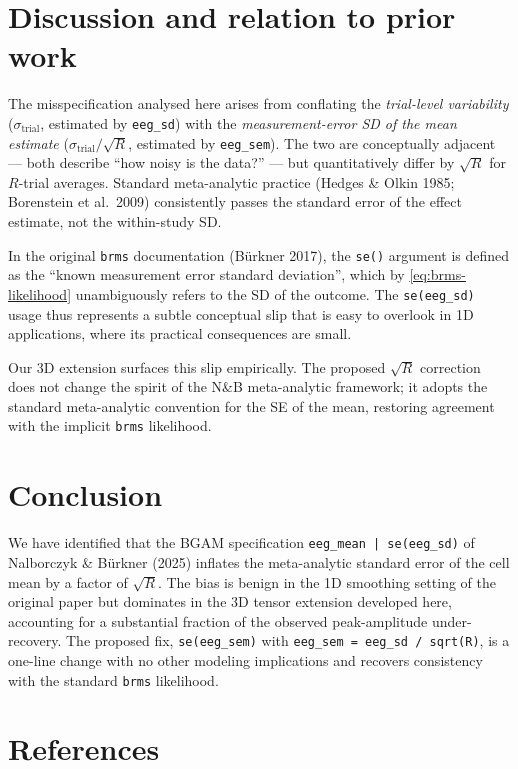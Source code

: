 \documentclass[11pt]{article}
\begin{document}
\section{Discussion and relation to prior work}

The misspecification analysed here arises from conflating the
\emph{trial-level variability} ($\sigma_{\text{trial}}$, estimated
by \texttt{eeg\_sd}) with the \emph{measurement-error SD of the
mean estimate} ($\sigma_{\text{trial}}/\sqrt{R}$, estimated by
\texttt{eeg\_sem}). The two are conceptually adjacent --- both
describe ``how noisy is the data?'' --- but quantitatively
differ by $\sqrt{R}$ for $R$-trial averages. Standard
meta-analytic practice (Hedges \& Olkin 1985; Borenstein et al.\
2009) consistently passes the standard error of the effect
estimate, not the within-study SD.

In the original \texttt{brms} documentation (B\"urkner 2017), the
\texttt{se()} argument is defined as the ``known measurement error
standard deviation'', which by \eqref{eq:brms-likelihood}
unambiguously refers to the SD of the outcome. The
\texttt{se(eeg\_sd)} usage thus represents a subtle conceptual
slip that is easy to overlook in 1D applications, where its
practical consequences are small.

Our 3D extension surfaces this slip empirically. The proposed
$\sqrt{R}$ correction does not change the spirit of the N\&B
meta-analytic framework; it adopts the standard meta-analytic
convention for the SE of the mean, restoring agreement with the
implicit \texttt{brms} likelihood.

\section{Conclusion}

We have identified that the BGAM specification
\texttt{eeg\_mean | se(eeg\_sd)} of Nalborczyk \& B\"urkner (2025)
inflates the meta-analytic standard error of the cell mean by a
factor of $\sqrt{R}$. The bias is benign in the 1D smoothing
setting of the original paper but dominates in the 3D tensor
extension developed here, accounting for a substantial fraction
of the observed peak-amplitude under-recovery. The proposed fix,
\texttt{se(eeg\_sem)} with
\texttt{eeg\_sem = eeg\_sd / sqrt(R)}, is a one-line change with
no other modeling implications and recovers consistency with the
standard \texttt{brms} likelihood.

\section*{References}
\end{document}
